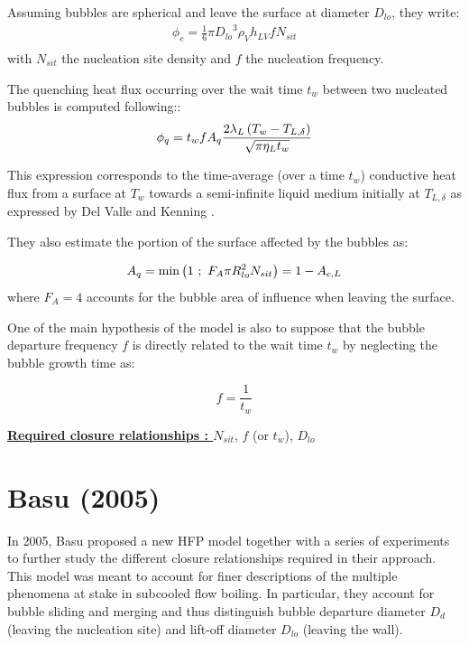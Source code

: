 \npar
Assuming bubbles are spherical and leave the surface at diameter $D_{lo}$, they write:
\begin{align}
\phi_{e}=\frac{1}{6}\pi {D_{lo}}^{3}\rho_{V}h_{LV}fN_{sit}\\
\label{eq:KP_hfp_phie}
\end{align}
with $N_{sit}$ the nucleation site density and $f$ the nucleation frequency.

The quenching heat flux occurring over the wait time $t_{w}$ between two nucleated bubbles is computed following::  
\begin{align}
\phi_{q}=t_{w}fA_{q}\frac{2\lambda_{L}\left( T_{w}-T_{L,\delta} \right)}{\sqrt{\pi \eta_{L} t_{w}}}
\label{eq:KP_hfp_phiq}
\end{align}

This expression corresponds to the time-average (over a time $t_{w}$) conductive heat flux from a surface at $T_{w}$ towards a semi-infinite liquid medium initially at $T_{L,\delta}$ as expressed by Del Valle and Kenning \cite{del_valle_subcooled_1985}.

\npar
They also estimate the portion of the surface affected by the bubbles as:

\begin{align}
A_{q}=\mathrm{min}\left( 1\ ;\ F_{A}\pi R_{lo}^{2} N_{sit} \right)=1-A_{c,L}
\label{eq:KP_hfp_Aq}
\end{align}
where $F_{A}=4$ accounts for the bubble area of influence when leaving the surface.

\npar

One of the main hypothesis of the model is also to suppose that the bubble departure frequency $f$ is directly related to the wait time $t_{w}$ by neglecting the bubble growth time as:

\begin{equation}
f = \frac{1}{t_{w}}
\end{equation}

\textbf{\underline{Required closure relationships : }} $N_{sit}$, $f$ (or $t_{w}$), $D_{lo}$ 


\section{Basu (2005)}
\label{sec:hfp_basu}

In 2005, Basu \etal \cite{basu2005, basu2005a} proposed a new HFP model together with a series of experiments to further study the different closure relationships required in their approach. This model was meant to account for finer descriptions of the multiple phenomena at stake in subcooled flow boiling. In particular, they account for bubble sliding and merging and thus distinguish bubble departure diameter $D_{d}$ (leaving the nucleation site) and lift-off diameter $D_{lo}$ (leaving the wall).

